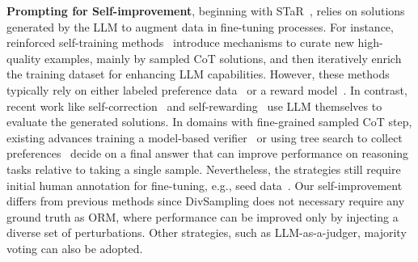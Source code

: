 \textbf{Prompting for Self-improvement}, beginning with STaR~\cite{zelikman2022star}, relies on solutions generated by the LLM to augment data in fine-tuning processes. For instance, reinforced self-training methods~\cite{gulcehre2023reinforced,hosseini2024v,singhbeyond,aksitov2023rest} introduce mechanisms to curate new high-quality examples, mainly by sampled CoT solutions, and then iteratively enrich the training dataset for enhancing LLM capabilities.
However, these methods typically rely on either labeled preference data~\cite{gulcehre2023reinforced} or a reward model~\cite{guan2024search, zelikman2022star,hosseini2024v}.
In contrast, recent work like self-correction~\cite{kumar2024training, zelikman2024, hosseini2024vstar, xi2024enhancing} and self-rewarding~\cite{yuan2024selfrewarding, chen2024selfplay, huang2024large} use LLM themselves to evaluate the generated solutions.
In domains with fine-grained sampled CoT step, existing advances training a model-based verifier~\cite{cobbe2021training, lightman2023let, wang2024math, min2024imitate} or using tree search to collect preferences~\cite{xie2024monte} decide on a final answer that can improve performance on reasoning tasks relative to taking a single sample.
Nevertheless, the strategies still require initial human annotation for fine-tuning, e.g., seed data~\cite{chen2024selfplay,lee2024llm2llm}.
Our self-improvement differs from previous methods since DivSampling does not necessary require any ground truth as ORM, where performance can be improved only by injecting a diverse set of perturbations. Other strategies, such as LLM-as-a-judger, majority voting can also be adopted.

